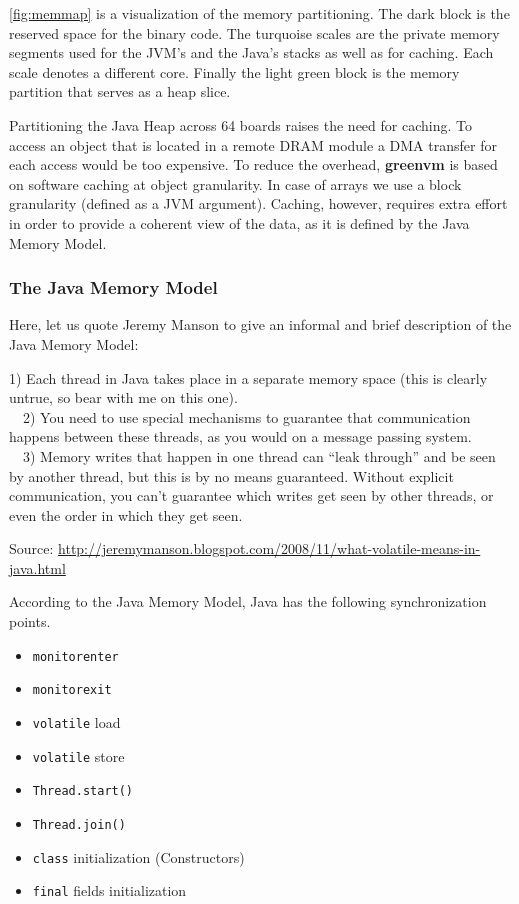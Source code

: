 \documentclass[
a4paper,
12pt,
]{report}
\newcommand{\gvm}{{\fontfamily{fco}\selectfont\textbf{\color{g}green\color{v}vm}}\xspace}
\newcommand{\java}{Java\texttrademark\xspace}
\begin{document}
\autoref{fig:memmap} is a visualization of the memory
partitioning. The dark block is the reserved space for the binary
code. The turquoise scales are the private memory segments used for
the JVM's and the \java's stacks as well as for caching. Each scale
denotes a different core. Finally the light green block is the memory
partition that serves as a heap slice.

Partitioning the \java Heap across 64 boards raises the need for
caching. To access an object that is located in a remote DRAM module a
DMA transfer for each access would be too expensive. To reduce the
overhead, \gvm is based on software caching at object granularity. In
case of arrays we use a block granularity (defined as a JVM argument).
Caching, however, requires extra effort in order to provide a coherent
view of the data, as it is defined by the \java Memory Model.

\subsubsection{The \java Memory Model}
Here, let us quote Jeremy Manson to give an informal and brief
description of the \java Memory Model:

\begin{quoting}
  1) Each thread in Java takes place in a separate memory space
  (this is clearly untrue, so bear with me on this one).\\
  \ ~2) You need to use special mechanisms to guarantee that
  communication happens between these threads, as you would on a
  message passing system.\\
  \ ~3) Memory writes that happen in one thread can ``leak through'' and
  be seen by another thread, but this is by no means
  guaranteed. Without explicit communication, you can't guarantee
  which writes get seen by other threads, or even the order in which
  they get seen.
\end{quoting}
Source: \url{http://jeremymanson.blogspot.com/2008/11/what-volatile-means-in-java.html}

According to the \java Memory Model, \java has the following
synchronization points.

\begin{itemize}
\item \verb!monitorenter!
\item \verb!monitorexit!
\item \verb!volatile! load
\item \verb!volatile! store
\item \verb!Thread.start()!
\item \verb!Thread.join()!
\item \verb!class! initialization (Constructors)
\item \verb!final! fields initialization
\end{itemize}
\end{document}
